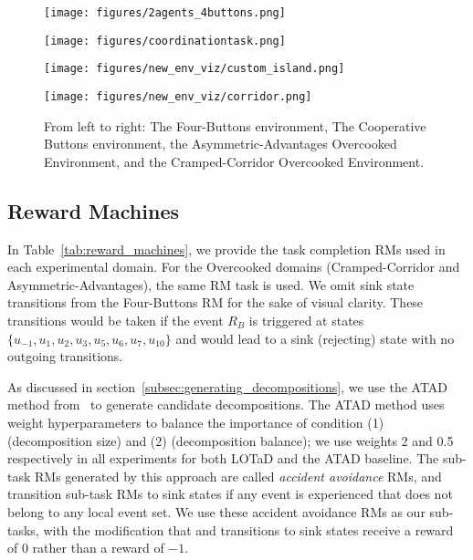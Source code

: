 \begin{figure*}[t]
    \centering
    \begin{minipage}{0.245\textwidth}
        \centering
        \texttt{[image: figures/2agents\_4buttons.png]}
    \end{minipage}
    \hfill
    \begin{minipage}{0.245\textwidth}
        \centering
        \texttt{[image: figures/coordinationtask.png]}
    \end{minipage}
    \hfill
    \begin{minipage}{0.298\textwidth}
        \centering
        \texttt{[image: figures/new\_env\_viz/custom\_island.png]}
    \end{minipage}
    \hfill
    \begin{minipage}{0.19\textwidth}
        \centering
        \texttt{[image: figures/new\_env\_viz/corridor.png]}
    \end{minipage}
    \caption{From left to right: The Four-Buttons environment, The Cooperative Buttons environment, the Asymmetric-Advantages Overcooked Environment, and the Cramped-Corridor Overcooked Environment.}
    \label{fig:all_other_envs}
\end{figure*}

\subsection{Reward Machines}
In Table~\ref{tab:reward_machines}, we provide the task completion RMs used in each experimental domain. For the Overcooked domains (Cramped-Corridor and Asymmetric-Advantages), the same RM task is used. We omit sink state transitions from the Four-Buttons RM for the sake of visual clarity. These transitions would be taken if the event $R_B$ is triggered at states $\{u_{-1}, u_1, u_2, u_3, u_5, u_6, u_7, u_{10}\}$ and would lead to a sink (rejecting) state with no outgoing transitions.

As discussed in section~\ref{subsec:generating_decompositions}, we use the ATAD method from~\cite{smith2023automatic} to generate candidate decompositions. The ATAD method uses weight hyperparameters to balance the importance of condition (1) (decomposition size) and (2) (decomposition balance); we use weights 2 and 0.5 respectively in all experiments for both LOTaD and the ATAD baseline.
The sub-task RMs generated by this approach are called \textit{accident avoidance} RMs, and transition sub-task RMs to sink states if any event is experienced that does not belong to any local event set. We use these accident avoidance RMs as our sub-tasks, with the modification that and transitions to sink states receive a reward of $0$ rather than a reward of $-1$.

